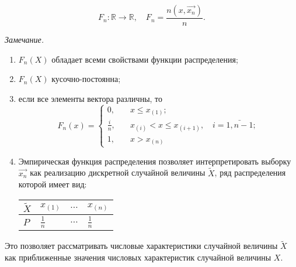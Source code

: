 \begin{equation}
    F_n:\mathbb{R}\rightarrow \mathbb{R},\quad F_n=\frac{n(x, \vec{x_n})}{n}.
\end{equation}

\textit{Замечание.}
\begin{enumerate}
    \item $F_n(X)$ обладает всеми свойствами функции распределения;
    \item $F_n(X)$ кусочно-постоянна;
    \item если все элементы вектора различны, то
    \begin{equation}
    F_n(x) = \begin{cases}
        0, & \quad x \leq x_{(1)};\\
        \frac{i}{n}, & \quad x_{(i)} < x \leq x_{(i+1)}, \quad i=\bar{1, n-1};\\
        1, & \quad x > x_{(n)}
    \end{cases}
\end{equation}
    \item Эмпирическая функция распределения позволяет интерпретировать выборку $\vec{x_n}$ как реализацию дискретной случайной величины $\widetilde{X}$, ряд распределения которой имеет вид:

   \begin{center}
    \begin{tabularx}{0.8\textwidth}{|>{\centering\arraybackslash}X|>{\centering\arraybackslash}X|>{\centering\arraybackslash}X|>{\centering\arraybackslash}X|}
        $\widetilde{X}$ & $x_{(1)}$ & $\ldots$ & $x_{(n)}$ \\
        \hline
        $P$ & $\frac{1}{n}$ & $\ldots$ & $\frac{1}{n}$ \\ 
    \end{tabularx}
\end{center}
\end{enumerate}

Это позволяет рассматривать числовые характеристики случайной величины $\widetilde{X}$ как приближенные значения числовых характеристик случайной величины $X$.